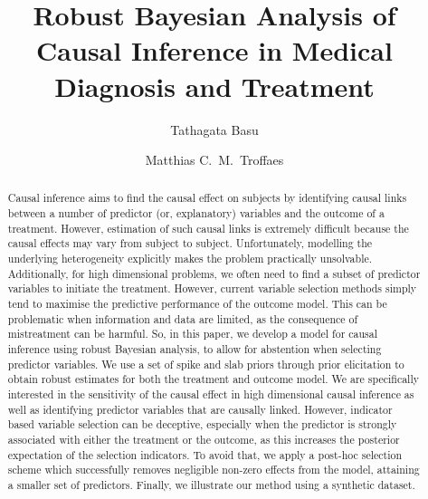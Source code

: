 \documentclass[preprint,12pt]{elsarticle}
\begin{document}
\begin{frontmatter}

\title{Robust Bayesian Analysis of Causal Inference in Medical Diagnosis and Treatment}
\author[1]{Tathagata Basu}
\author[2]{Matthias C.~M.~Troffaes}

\begin{abstract}
Causal inference aims to find the causal effect on subjects
by identifying causal links between
a number of predictor (or, explanatory) variables and the outcome of a treatment.
However, estimation of such causal links is extremely 
difficult because the causal effects may vary from subject 
to subject. Unfortunately, modelling the underlying heterogeneity explicitly makes the 
problem practically unsolvable. Additionally, for high dimensional problems,
we often need to find a subset of 
predictor variables to initiate the treatment. However, current variable selection methods
simply tend to maximise the predictive performance of the outcome model. This can be problematic when information and data are limited,
as the consequence of mistreatment can be harmful. 
So, in this paper, we develop a model for causal inference using
robust Bayesian analysis, to allow for abstention when selecting
predictor variables.
We
use a set of spike and slab priors 
through prior elicitation to obtain robust estimates for
both the treatment and outcome model. We are specifically interested 
in the sensitivity of the causal effect in high dimensional causal inference
as well as identifying predictor variables that are causally linked. However, indicator
based variable selection can be deceptive, especially
when the predictor is strongly associated with either the treatment or 
the outcome, as this increases the posterior expectation of the selection
indicators. To avoid that, we apply a post-hoc selection scheme
which successfully removes negligible non-zero effects from the model,
attaining a smaller set of 
predictors.
Finally, we illustrate
our method using a synthetic dataset.
\end{abstract}


\end{frontmatter}
\end{document}
